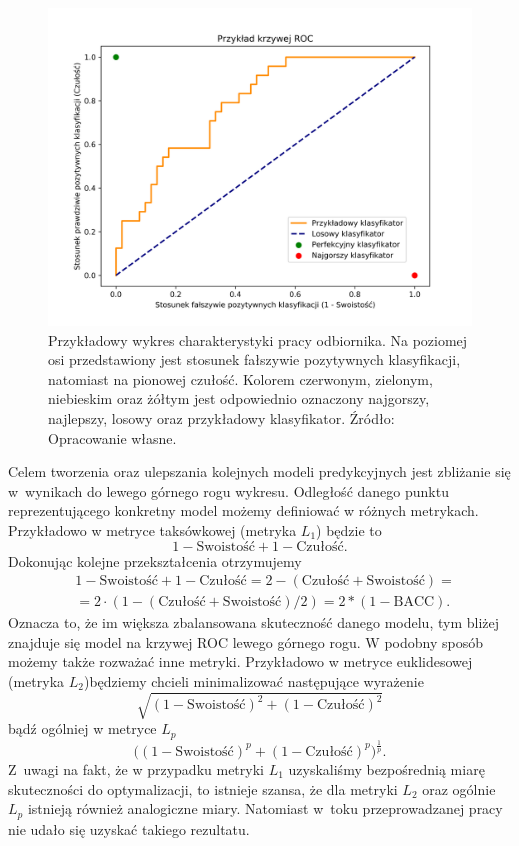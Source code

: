 \documentclass[inzynierska]{pwr_wmat_praca_dyplomowa}
\theoremstyle{plain}
\numberwithin{theorem}{chapter}
\theoremstyle{definition}
\numberwithin{theorem}{chapter}
\begin{document}
\begin{figure}[h]
	\includegraphics[width=\linewidth]{images/roc_example.png}
	\caption{Przykładowy wykres charakterystyki pracy odbiornika. Na poziomej osi przedstawiony jest stosunek fałszywie pozytywnych klasyfikacji, natomiast na pionowej czułość. Kolorem czerwonym, zielonym, niebieskim oraz żółtym jest odpowiednio oznaczony najgorszy, najlepszy, losowy oraz przykładowy klasyfikator. Źródło: Opracowanie własne.}
	\label{fig:roc_example}
\end{figure}

Celem tworzenia oraz ulepszania kolejnych modeli predykcyjnych jest zbliżanie się w~wynikach do lewego górnego rogu wykresu. Odległość danego punktu reprezentującego konkretny model możemy definiować w różnych metrykach. Przykładowo w metryce taksówkowej (metryka $L_1$) będzie to 
$$ 1 - \text{Swoistość} + 1 - \text{Czułość} \text{.}$$
Dokonując kolejne przekształcenia otrzymujemy
\begin{equation*}
\begin{split}
& 1 - \text{Swoistość} + 1 - \text{Czułość} = 2 - (\text{Czułość} + \text{Swoistość}) = \\
& = 2 \cdot (1 - (\text{Czułość} + \text{Swoistość})/2) = 2*(1 - \text{BACC}) \text{.}
\end{split}
\end{equation*}
Oznacza to, że im większa zbalansowana skuteczność danego modelu, tym bliżej znajduje się model na krzywej ROC lewego górnego rogu. W podobny sposób możemy także rozważać inne metryki. Przykładowo w metryce euklidesowej (metryka $L_2$)będziemy chcieli minimalizować następujące wyrażenie
$$ \sqrt{(1 - \text{Swoistość})^2 + (1 - \text{Czułość})^2} $$
bądź ogólniej w metryce $L_p$
$$ \big( (1 - \text{Swoistość})^p + (1 - \text{Czułość})^p \big)^{\frac{1}{p}} \text{.} $$
Z~uwagi na fakt, że w przypadku metryki $L_1$ uzyskaliśmy bezpośrednią miarę skuteczności do optymalizacji, to istnieje szansa, że dla metryki $L_2$ oraz ogólnie $L_p$ istnieją również analogiczne miary. Natomiast w~toku przeprowadzanej pracy nie udało się uzyskać takiego rezultatu. 
\end{document}
